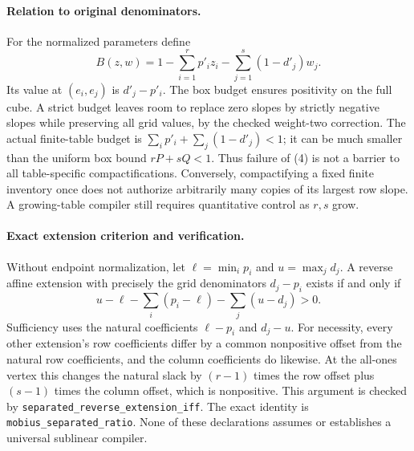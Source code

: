 \documentclass[11pt]{article}
\begin{document}
\paragraph{Relation to original denominators.}
For the normalized parameters define
\[
 B(z,w)=1-\sum_{i=1}^r p'_i z_i
          -\sum_{j=1}^s(1-d'_j)w_j.
\]
Its value at $(e_i,e_j)$ is $d'_j-p'_i$. The box budget ensures
positivity on the full cube. A strict budget leaves room to replace
zero slopes by strictly negative slopes while preserving all grid
values, by the checked weight-two correction. The actual finite-table budget is
$\sum_i p'_i+\sum_j(1-d'_j)<1$; it can be much smaller than the
uniform box bound $rP+sQ<1$. Thus failure of (4) is not a barrier to
all table-specific compactifications. Conversely, compactifying a
fixed finite inventory once does not authorize arbitrarily many
copies of its largest row slope. A growing-table compiler still
requires quantitative control as $r,s$ grow.

\paragraph{Exact extension criterion and verification.}
Without endpoint normalization, let $\ell=\min_i p_i$ and
$u=\max_j d_j$. A reverse affine extension with precisely the grid
denominators $d_j-p_i$ exists if and only if
\[
 u-\ell-\sum_i(p_i-\ell)-\sum_j(u-d_j)>0.
\]
Sufficiency uses the natural coefficients $\ell-p_i$ and $d_j-u$.
For necessity, every other extension's row coefficients differ by a
common nonpositive offset from the natural row coefficients, and the
column coefficients do likewise. At the all-ones vertex this changes
the natural slack by $(r-1)$ times the row offset plus $(s-1)$ times
the column offset, which is nonpositive. This argument is checked by
\texttt{separated\_reverse\_extension\_iff}. The exact identity is
\texttt{mobius\_separated\_ratio}. None of these declarations assumes
or establishes a universal sublinear compiler.
\end{document}
